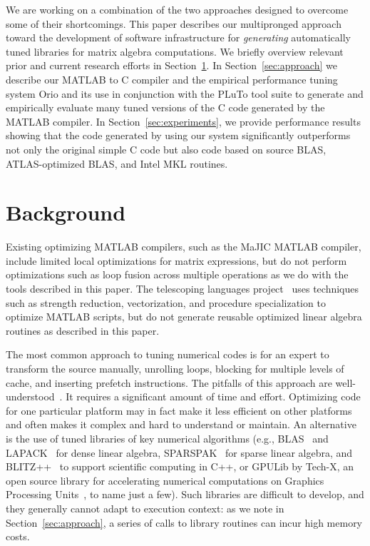 \documentclass[11pt]{article}
\begin{document}
We are working on a combination of the two approaches designed to overcome some of their shortcomings.   This paper describes our multipronged approach toward the development of software infrastructure for \emph{generating} automatically tuned libraries for matrix algebra computations.  We briefly overview relevant prior and current research efforts in Section~\ref{sec:background}. In Section~\ref{sec:approach} we describe our MATLAB to C compiler and the empirical performance tuning system Orio and its use in conjunction with the PLuTo tool suite to generate and empirically evaluate many tuned versions of the C code generated by the MATLAB compiler.  In Section~\ref{sec:experiments}, we provide performance results showing that the code generated by using our system significantly outperforms not only the original simple C code but also code based on source BLAS, ATLAS-optimized BLAS, and Intel MKL routines.

\section{Background}
\label{sec:background}

Existing optimizing MATLAB compilers, such as the MaJIC MATLAB compiler, include limited local optimizations for matrix expressions, but do not perform optimizations such as loop fusion across multiple operations as we do with the tools described in this paper. The telescoping languages project~\cite{telescopingurl,teleoverview,Ken99} uses techniques such as strength reduction, vectorization, and procedure specialization to optimize MATLAB scripts, but do not generate reusable optimized linear algebra routines as described in this paper.

The most common approach  to tuning numerical codes is for an expert to transform the source manually, unrolling loops, blocking for multiple levels of cache, and inserting prefetch instructions.  The pitfalls of this approach are well-understood~\cite{Goedecker01}.  It requires a significant amount of time and effort. Optimizing code for one particular platform may in fact make it less efficient on other platforms and often makes it complex and hard to understand or maintain.    An alternative is the use of tuned libraries of key numerical algorithms (e.g., BLAS~\cite{Dongarra:1990fk} and LAPACK~\cite{LAPACK} for dense linear algebra, SPARSPAK~\cite{sparspak} for sparse linear algebra, and BLITZ++~\cite{blitz} to support scientific computing in C++, or GPULib by Tech-X, an open source library for accelerating numerical computations on Graphics Processing Units~\cite{gpulib}, to name just a few). Such libraries are difficult to develop, and they generally cannot adapt to execution context: as we note in Section~\ref{sec:approach}, a series of calls to library routines can incur high memory costs.
\end{document}
